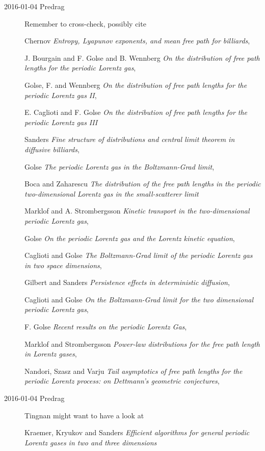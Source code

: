 \begin{description}
\item[2016-01-04 Predrag] Remember to cross-check, possibly cite

Chernov {\em Entropy, {Lyapunov} exponents, and mean free path for billiards},

J. Bourgain and F. Golse and B. Wennberg
{\em On the distribution of free path lengths for the periodic Lorentz gas},

Golse, F. and Wennberg
{\em On the distribution of free path lengths for the periodic Lorentz gas II},

E. Caglioti and F. Golse
{\em On the distribution of free path lengths for the periodic Lorentz gas III}

Sanders
{\em Fine structure of distributions and central limit theorem in diffusive billiards},

Golse
{\em The periodic Lorentz gas in the {Boltzmann-Grad} limit},

Boca and Zaharescu {\em The distribution of the free path lengths in the periodic two-dimensional Lorentz gas in the small-scatterer limit}

Marklof and A. Strombergsson {\em Kinetic transport in the two-dimensional periodic Lorentz gas},

Golse {\em On the periodic Lorentz gas and the Lorentz kinetic equation},

Caglioti and Golse {\em The {Boltzmann-Grad} limit of the periodic Lorentz gas in two space dimensions},

Gilbert and Sanders {\em Persistence effects in deterministic diffusion},

Caglioti and Golse {\em On the {Boltzmann-Grad} limit for the two dimensional periodic Lorentz gas},

F. Golse {\em Recent results on the periodic Lorentz Gas},

Marklof and Strombergsson
{\em Power-law distributions for the free path length in Lorentz gases},

Nandori, Szasz and Varju
{\em Tail asymptotics of free path lengths for the periodic Lorentz process:
  on Dettmann's geometric conjectures},


\item[2016-01-04 Predrag]
Tingnan might want to have a look at

Kraemer, Kryukov and Sanders
{\em Efficient algorithms for general periodic {Lorentz} gases in two and three dimensions}



\end{description}
